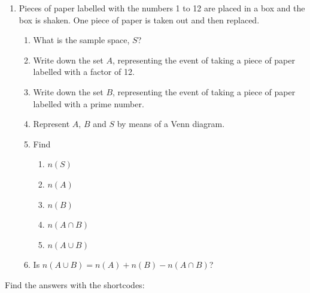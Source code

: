 \begin{enumerate}[noitemsep, label=\textbf{\arabic*}. ]
\begin{enumerate}[noitemsep, label=\textbf{\alph*}. ]
\end{enumerate}
                \label{m39377*uid24}\item Pieces of paper labelled with the numbers 1 to 12
are placed in a box and the box is shaken. One piece of paper is taken out and
then replaced.
\label{m39377*id111437}\begin{enumerate}[noitemsep, label=\textbf{\alph*}. ] 
            \label{m39377*uid25}\item What is the sample space, $S$?
\label{m39377*uid26}\item Write down the set $A$, representing the event of taking a
piece of paper labelled with a factor of 12.
\label{m39377*uid27}\item Write down the set $B$, representing the event of taking a
piece of paper labelled with a prime number.
\label{m39377*uid28}\item Represent $A$, \begin{math}B\end{math} and \begin{math}S\end{math} by means of a Venn diagram.
\label{m39377*uid29}\item Find
\label{m39377*id111546}\begin{enumerate}[noitemsep, label=\textbf{\roman*}. ] 
            \label{m39377*uid30}\item $n\left(S\right)$\label{m39377*uid31}\item \begin{math}n\left(A\right)\end{math}\label{m39377*uid32}\item \begin{math}n\left(B\right)\end{math}\label{m39377*uid33}\item \begin{math}n\left(A\cap B\right)\end{math}\label{m39377*uid34}\item \begin{math}n\left(A\cup B\right)\end{math}\end{enumerate}
        \label{m39377*uid35}\item Is $n\left(A\cup B\right)=n\left(A\right)+n\left(B\right)-n\left(A\cap B\right)$?
\end{enumerate}
                \end{enumerate}
  \label{m39377**end}
\par {} Find the answers with the shortcodes:

